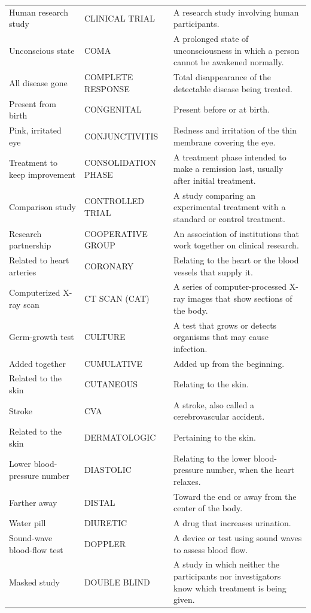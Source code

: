 \begin{longtable}{>{\raggedright\arraybackslash}p{} >{\raggedright\arraybackslash}p{} >{\raggedright\arraybackslash}p{}}
Human research study & CLINICAL TRIAL & A research study involving human participants. \\
Unconscious state & COMA & A prolonged state of unconsciousness in which a person cannot be awakened normally. \\
All disease gone & COMPLETE RESPONSE & Total disappearance of the detectable disease being treated. \\
Present from birth & CONGENITAL & Present before or at birth. \\
Pink, irritated eye & CONJUNCTIVITIS & Redness and irritation of the thin membrane covering the eye. \\
Treatment to keep improvement & CONSOLIDATION PHASE & A treatment phase intended to make a remission last, usually after initial treatment. \\
Comparison study & CONTROLLED TRIAL & A study comparing an experimental treatment with a standard or control treatment. \\
Research partnership & COOPERATIVE GROUP & An association of institutions that work together on clinical research. \\
Related to heart arteries & CORONARY & Relating to the heart or the blood vessels that supply it. \\
Computerized X-ray scan & CT SCAN (CAT) & A series of computer-processed X-ray images that show sections of the body. \\
Germ-growth test & CULTURE & A test that grows or detects organisms that may cause infection. \\
Added together & CUMULATIVE & Added up from the beginning. \\
Related to the skin & CUTANEOUS & Relating to the skin. \\
Stroke & CVA & A stroke, also called a cerebrovascular accident. \\
Related to the skin & DERMATOLOGIC & Pertaining to the skin. \\
Lower blood-pressure number & DIASTOLIC & Relating to the lower blood-pressure number, when the heart relaxes. \\
Farther away & DISTAL & Toward the end or away from the center of the body. \\
Water pill & DIURETIC & A drug that increases urination. \\
Sound-wave blood-flow test & DOPPLER & A device or test using sound waves to assess blood flow. \\
Masked study & DOUBLE BLIND & A study in which neither the participants nor investigators know which treatment is being given. \\

\end{longtable}
